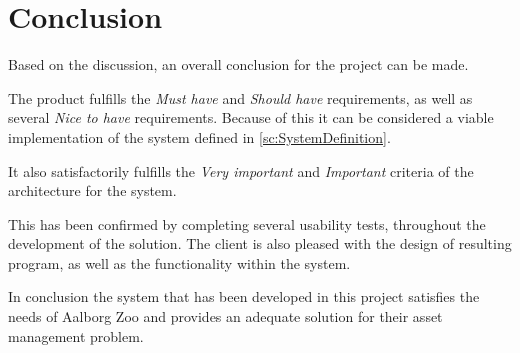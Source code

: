 \chapter{Conclusion}\label{ch:conclusion} 
Based on the discussion, an overall conclusion for the project can be made. 
\par
The product fulfills the \textit{Must have} and \textit{Should have} requirements, as well as several \textit{Nice to have} requirements. Because of this it can be considered a viable implementation of the system defined in \autoref{sc:SystemDefinition}.
\par
It also satisfactorily fulfills the \textit{Very important} and \textit{Important} criteria of the architecture for the system.
\par
This has been confirmed by completing several usability tests, throughout the development of the solution. The client is also pleased with the design of resulting program, as well as the functionality within the system. 
\par
In conclusion the system that has been developed in this project satisfies the needs of Aalborg Zoo and provides an adequate solution for their asset management problem.